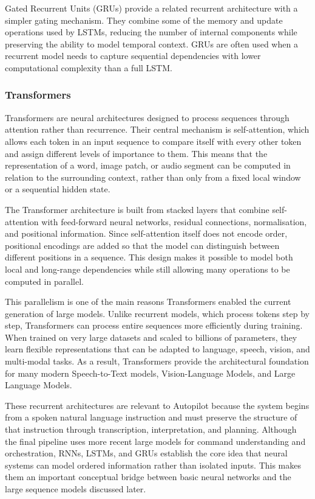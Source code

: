Gated Recurrent Units (GRUs) \cite{Cho2014} provide a related recurrent architecture with a simpler gating mechanism. They combine some of the memory and update operations used by LSTMs, reducing the number of internal components while preserving the ability to model temporal context. GRUs are often used when a recurrent model needs to capture sequential dependencies with lower computational complexity than a full LSTM.

\subsubsection{Transformers}

Transformers \cite{Vaswani2017} are neural architectures designed to process sequences through attention rather than recurrence. Their central mechanism is self-attention, which allows each token in an input sequence to compare itself with every other token and assign different levels of importance to them. This means that the representation of a word, image patch, or audio segment can be computed in relation to the surrounding context, rather than only from a fixed local window or a sequential hidden state.

The Transformer architecture is built from stacked layers that combine self-attention with feed-forward neural networks, residual connections, normalisation, and positional information. Since self-attention itself does not encode order, positional encodings are added so that the model can distinguish between different positions in a sequence. This design makes it possible to model both local and long-range dependencies while still allowing many operations to be computed in parallel.

This parallelism is one of the main reasons Transformers enabled the current generation of large models. Unlike recurrent models, which process tokens step by step, Transformers can process entire sequences more efficiently during training. When trained on very large datasets and scaled to billions of parameters, they learn flexible representations that can be adapted to language, speech, vision, and multi-modal tasks. As a result, Transformers provide the architectural foundation for many modern Speech-to-Text models, Vision-Language Models, and Large Language Models.

These recurrent architectures are relevant to Autopilot because the system begins from a spoken natural language instruction and must preserve the structure of that instruction through transcription, interpretation, and planning. Although the final pipeline uses more recent large models for command understanding and orchestration, RNNs, LSTMs, and GRUs establish the core idea that neural systems can model ordered information rather than isolated inputs. This makes them an important conceptual bridge between basic neural networks and the large sequence models discussed later.

